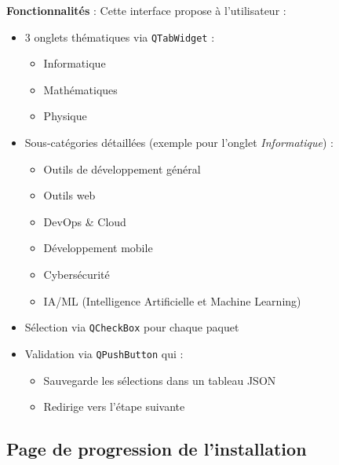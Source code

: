 \textbf{Fonctionnalités} :  
Cette interface propose à l'utilisateur :
\begin{itemize}
    \item 3 onglets thématiques via \texttt{QTabWidget} :
    \begin{itemize}
        \item Informatique
        \item Mathématiques
        \item Physique
    \end{itemize}
    
    \item Sous-catégories détaillées (exemple pour l'onglet \textit{Informatique}) :
    \begin{itemize}
        \item Outils de développement général
        \item Outils web
        \item DevOps \& Cloud
        \item Développement mobile
        \item Cybersécurité
        \item IA/ML (Intelligence Artificielle et Machine Learning)
    \end{itemize}
    
    \item Sélection via \texttt{QCheckBox} pour chaque paquet
    \item Validation via \texttt{QPushButton} qui :
    \begin{itemize}
        \item Sauvegarde les sélections dans un tableau JSON
        \item Redirige vers l'étape suivante
    \end{itemize}
\end{itemize}





\subsection{Page de progression de l'installation}
\label{subsec:installation-progress}

